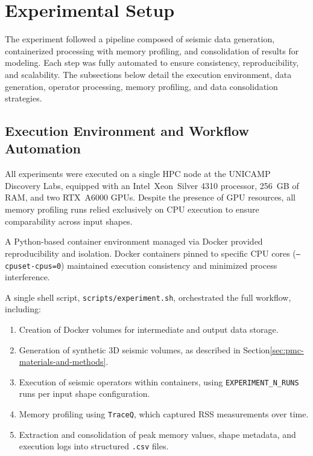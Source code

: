 \section{Experimental Setup}
\label{sec:pmc-experimental-setup}

The experiment followed a pipeline composed of seismic data generation, containerized processing with memory profiling, and consolidation of results for modeling.
Each step was fully automated to ensure consistency, reproducibility, and scalability.
The subsections below detail the execution environment, data generation, operator processing, memory profiling, and data consolidation strategies.

\subsection{Execution Environment and Workflow Automation}
\label{subsec:pmc-execution-environment-and-workflow-automation}

All experiments were executed on a single \ac{HPC} node at the \ac{UNICAMP} Discovery Labs, equipped with an Intel\textregistered\ Xeon\textregistered\ Silver 4310 processor, 256~\ac{GB} of \ac{RAM}, and two \ac{RTX}~A6000 \ac{GPU}s. Despite the presence of \ac{GPU} resources, all memory profiling runs relied exclusively on \ac{CPU} execution to ensure comparability across input shapes.

A Python-based container environment managed via Docker provided reproducibility and isolation.
Docker containers pinned to specific \ac{CPU} cores (\texttt{–cpuset-cpus=0}) maintained execution consistency and minimized process interference.

A single shell script, \texttt{scripts/experiment.sh}\cite{delucca2025experiment2script}, orchestrated the full workflow, including:
\begin{enumerate}
    \item Creation of Docker volumes for intermediate and output data storage.
    \item Generation of synthetic \ac{3D} seismic volumes, as described in Section\ref{sec:pmc-materials-and-methods}.
    \item Execution of seismic operators within containers, using \texttt{EXPERIMENT\_N\_RUNS} runs per input shape configuration.
    \item Memory profiling using \texttt{TraceQ}, which captured \ac{RSS} measurements over time.
    \item Extraction and consolidation of peak memory values, shape metadata, and execution logs into structured \texttt{.csv} files.
\end{enumerate}

